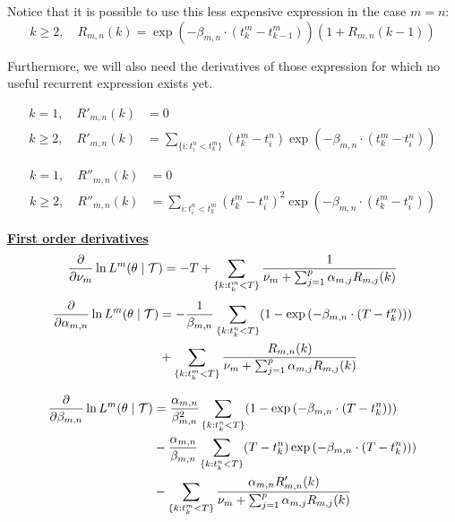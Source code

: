 \documentclass[11pt]{book}
\newcommand{\lsum}[1]{\sum_{ \{k : t_k^#1 < T \} }}
\newcommand{\lexp}[1]{
\exp \left ( - \beta_{m,n} \cdot ( T - t_k^#1 ) \right ) 
}
\newcommand{\denomR}{\nu_m + \sum_{j=1}^p \alpha_{m,j} R_{m,j} (k) }
\begin{document}
\begin{remarque}
Notice that it is possible to use this less expensive expression in the case $m=n$: 
$$k \geq 2, \quad R_{m,n} (k) = \exp ( - \beta_{m,n} \cdot ( t_k^m - t^m_{k-1} ) ) (1 + R_{m,n} (k-1))$$

\end{remarque}

Furthermore, we will also need the derivatives of those expression for which no useful recurrent expression exists yet. 


\begin{align*}
k = 1, \quad R'_{m,n} (k) &= 0 \\
k \geq 2, \quad R'_{m,n} (k) &= \sum_{ \{i : t_i^n < t_k^m \} } (t_k^m - t_i^n)  \exp \left ( - \beta_{m,n} \cdot ( t_k^m - t_i^n ) \right )
\end{align*}


\begin{align*}
k = 1, \quad R''_{m,n} (k) &= 0 \\
k \geq 2, \quad R''_{m,n} (k) &= \sum_{i : t_i^n < t_k^m } (t_k^m - t_i^n)^2  \exp ( - \beta_{m,n} \cdot ( t_k^m - t_i^n ) )
\end{align*}















\vspace{0.6 cm}
\underline{\textbf{First order derivatives}}
\begin{equation}
\frac{\partial } {\partial \nu_m} \ln L^m ( \theta \mid \Tau ) = - T + \lsum{m} \frac 1 {\denomR}
\end{equation}
\begin{align}
\frac{\partial  } {\partial \alpha_{m,n}} \ln L^m ( \theta \mid \Tau ) &= - \frac 1 {\beta_{m,n}} \lsum{n} ( 1 - \lexp{n} ) \notag \\ &+ \lsum{m} \frac{R_{m,n}(k)}{\denomR}
\end{align}

\begin{align}
\frac{\partial  } {\partial \beta_{m,n}} \ln L^m ( \theta \mid \Tau ) &= \frac {\alpha_{m,n}} {\beta_{m,n}^2} \lsum{n} ( 1 - \lexp{n} ) \notag \\ 
&-  \frac{ \alpha_{m,n} } { \beta_{m,n} } \lsum{n} ( T-t_k^n) \lexp{n} ) \notag \\ 
&- \lsum{m} \frac{\alpha_{m,n} R'_{m,n} (k) }{ \denomR}
\end{align}
\end{document}
